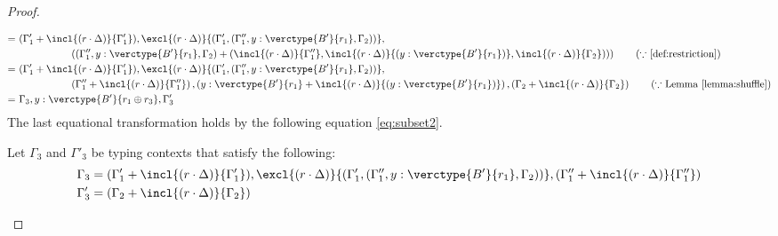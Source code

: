 \begin{proof}
\begin{itemize}
\begin{itemize}
\begin{align*}
=\ &(\Gamma'_1+\incl{(r\cdot\Delta)}{\Gamma'_1}),\excl{(r\cdot\Delta)}{(\Gamma'_1,(\Gamma''_1, y:\verctype{B'}{r_1}, \Gamma_2))},\\
&\hspace{5em} \left((\Gamma''_1, y:\verctype{B'}{r_1}, \Gamma_2) + \left(\incl{(r\cdot\Delta)}{\Gamma''_1}, \incl{(r\cdot\Delta)}{(y:\verctype{B'}{r_1})}, \incl{(r\cdot\Delta)}{\Gamma_2})\right)\right) \tag{$\because$ \ref{def:restriction}}\\
=\ &(\Gamma'_1+\incl{(r\cdot\Delta)}{\Gamma'_1}),\excl{(r\cdot\Delta)}{(\Gamma'_1,(\Gamma''_1, y:\verctype{B'}{r_1}, \Gamma_2))},\\
&\hspace{5em} \left(\Gamma''_1+\incl{(r\cdot\Delta)}{\Gamma''_1}\right), \left(y:\verctype{B'}{r_1}+ \incl{(r\cdot\Delta)}{(y:\verctype{B'}{r_1})}\right), \left(\Gamma_2 + \incl{(r\cdot\Delta)}{\Gamma_2}\right) \tag{$\because$ Lemma \ref{lemma:shuffle}}\\
=\ &\Gamma_3, y:\verctype{B'}{r_1\oplus r_3}, \Gamma'_3
\end{align*}
The last equational transformation holds by the following equation \ref{eq:subset2}.\par
Let $\Gamma_3$ and $\Gamma'_3$ be typing contexts that satisfy the following:
\begin{align*}
\Gamma_3 &= (\Gamma'_1+\incl{(r\cdot\Delta)}{\Gamma'_1}),\excl{(r\cdot\Delta)}{(\Gamma'_1,(\Gamma''_1, y:\verctype{B'}{r_1}, \Gamma_2))}, \left(\Gamma''_1+\incl{(r\cdot\Delta)}{\Gamma''_1}\right)\\
\Gamma'_3 &= \left(\Gamma_2 + \incl{(r\cdot\Delta)}{\Gamma_2}\right)
\end{align*}


\end{itemize}
\end{itemize}
\end{proof}
